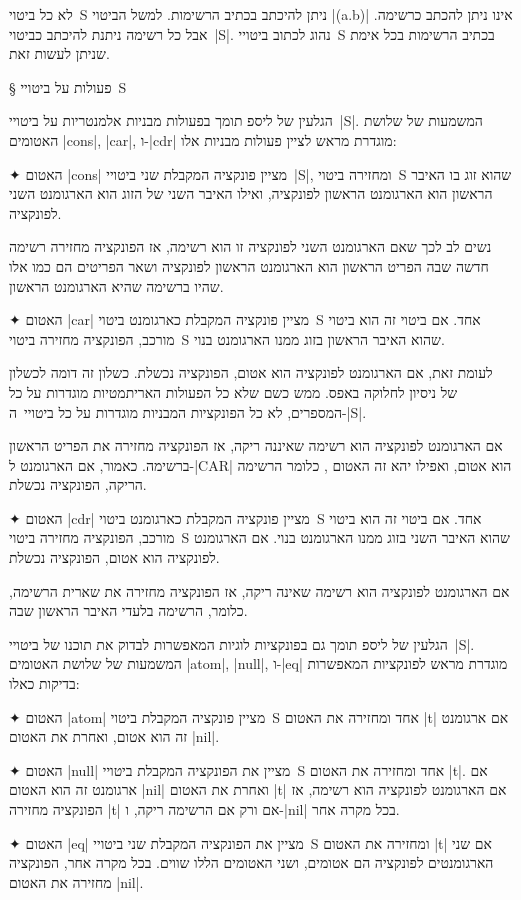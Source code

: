 \documentclass[a4paper,12pt,reqno]{article}
\begin{document}
לא כל ביטוי~S ניתן להיכתב בכתיב הרשימות. למשל הביטוי \E|(a.b)| אינו ניתן להכתב
כרשימה. אבל כל רשימה ניתנת להיכתב כביטוי~\E|S|. נהוג לכתוב ביטויי~S בכתיב
הרשימות בכל אימת שניתן לעשות זאת.

§ פעולות על ביטויי~S

הגלעין של ליספ תומך בפעולות מבניות אלמנטריות על ביטויי~\E|S|. המשמעות של שלושת
האטומים \T|cons|, \T|car|, ו-\T|cdr| מוגדרת מראש לציין פעולות מבניות אלו:

\begin{enumerate}
  ✦ האטום \T|cons| מציין פונקציה המקבלת שני ביטויי~\E|S|, ומחזירה ביטוי~S
  שהוא זוג בו האיבר הראשון הוא הארגומנט הראשון לפונקציה, ואילו האיבר השני של
  הזוג הוא הארגומנט השני לפונקציה.

  נשים לב לכך שאם הארגומנט השני לפונקציה זו הוא רשימה, אז הפונקציה מחזירה
  רשימה חדשה שבה הפריט הראשון הוא הארגומנט הראשון לפונקציה ושאר
  הפריטים הם כמו אלו שהיו ברשימה שהיא הארגומנט הראשון.

  ✦ האטום \T|car| מציין פונקציה המקבלת כארגומנט ביטוי~S אחד. אם ביטוי זה הוא
  ביטוי מורכב, הפונקציה מחזירה ביטוי~S שהוא האיבר הראשון בזוג ממנו הארגומנט
  בנוי.

  לעומת זאת, אם הארגומנט לפונקציה הוא אטום, הפונקציה נכשלת. כשלון זה דומה
  לכשלון של ניסיון לחלוקה באפס. ממש כשם שלא כל הפעולות האריתמטיות מוגדרות על כל
  המספרים, לא כל הפונקציות המבניות מוגדרות על כל ביטויי~ה-\E|S|.

  אם הארגומנט לפונקציה הוא רשימה שאיננה ריקה, אז הפונקציה מחזירה את הפריט
  הראשון ברשימה. כאמור, אם הארגומנט ל-\E|CAR| הוא אטום, ואפילו יהא זה
  האטום , כלומר הרשימה הריקה, הפונקציה נכשלת.

  ✦ האטום \T|cdr| מציין פונקציה המקבלת כארגומנט ביטוי~S אחד. אם ביטוי זה הוא
  ביטוי מורכב, הפונקציה מחזירה ביטוי~S שהוא האיבר השני בזוג ממנו הארגומנט בנוי.
  אם הארגומנט לפונקציה הוא אטום, הפונקציה נכשלת.

  אם הארגומנט לפונקציה הוא רשימה שאינה ריקה, אז הפונקציה מחזירה את
  שארית הרשימה, כלומר, הרשימה בלעדי האיבר הראשון שבה.
\end{enumerate}

הגלעין של ליספ תומך גם בפונקציות לוגיות המאפשרות לבדוק את תוכנו של
ביטויי~\E|S|. המשמעות של שלושת האטומים \T|atom|, \T|null|, ו-\T|eq| מוגדרת
מראש לפונקציות המאפשרות בדיקות כאלו:

\begin{enumerate}
  ✦ האטום \T|atom| מציין פונקציה המקבלת ביטוי~S אחד ומחזירה את האטום \T|t| אם
  ארגומנט זה הוא אטום, ואחרת את האטום \T|nil|.

  ✦ האטום \T|null| מציין את הפונקציה המקבלת ביטויי~S אחד ומחזירה את האטום
  \T|t|. אם ארגומנט זה הוא האטום \T|nil| ואחרת את האטום \T|t| אם הארגומנט
  לפונקציה הוא רשימה, אז הפונקציה מחזירה \T|t| אם ורק אם הרשימה ריקה, ו-\T|nil|
  בכל מקרה אחר.

  ✦ האטום \T|eq| מציין את הפונקציה המקבלת שני ביטויי~S ומחזירה את האטום \T|t|
  אם שני הארגומנטים לפונקציה הם אטומים, ושני האטומים הללו שווים. בכל מקרה אחר,
  הפונקציה מחזירה את האטום \T|nil|.
\end{enumerate}
\end{document}
